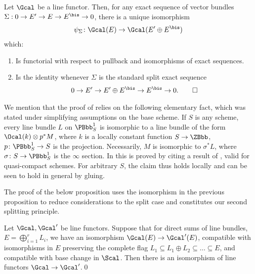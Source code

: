 \begin{proposition}\label{prop:split} Let $\Gcal$ be a line functor. Then, for any exact sequence of vector bundles $\Sigma: 0 \to E^{\prime} \to E \to E^{\bis} \to 0$, there is a unique isomorphism\vspace*{-3pt}\enlargethispage{.5\baselineskip}%
\begin{displaymath}
\psi_\Sigma\colon \Gcal(E) \to \Gcal(E^{\prime} \oplus E^{\bis})
\end{displaymath}
which:
\begin{enumerate}
\item Is functorial with respect to pullback and isomorphisms of exact sequences.
\item Is the identity whenever $\Sigma$ is the standard split exact sequence\vspace*{-3pt}
\begin{multline}\label{eq:standardsplit}
\mbox{}\hfill 0 \to E^{\prime} \to E^{\prime} \oplus E^{\bis} \to E^{\bis} \to 0.\hfill\mbox{}\qed
\end{multline}
\end{enumerate}
\end{proposition}

\begin{remark} \label{rem:linebundlesonprojective}
We mention that the proof of \cite[Prop.\,2.2]{Eriksson-Freixas-Wentworth} relies on the following elementary fact, which was stated under simplifying assumptions on the base scheme. If $S$ is any scheme, every line bundle $L$ on $\PBbb^{1}_{S}$ is isomorphic to a line bundle of the form $\Ocal(k)\otimes p^{\ast}M$, where $k$ is a locally constant function $S\to\ZBbb$, $p\colon\PBbb^{1}_{S}\to S $ is the projection. Necessarily, $M$ is isomorphic to $\sigma^{\ast}L$, where $\sigma\colon S\to\PBbb^{1}_{S}$ is the $\infty$ section. In \loccit this is proved by citing a result of \cite{Quillen:K-theory-I}, valid for quasi-compact schemes. For arbitrary $S$, the claim thus holds locally and can be seen to hold in general by gluing.
\end{remark}

The proof of the below proposition uses the isomorphism in the previous proposition to reduce considerations to the split case and constitutes our second splitting principle.

\begin{proposition} \label{Prop:2ndsplitting}Let $\Gcal, \Gcal'$ be line functors. Suppose that for direct sums of line bundles, $E = \bigoplus_{i=1}^{r} L_i$, we have an isomorphism $\Gcal(E) \to \Gcal'(E)$, compatible with isomorphisms in $E$ preserving the complete flag \hbox{$L_1 \subseteq L_1 \oplus L_2 \subseteq \ldots \subseteq E$}, and compatible with base change in $\Scal$. Then there is an isomorphism of line functors $\Gcal \to \Gcal'$.\qed
\end{proposition}

